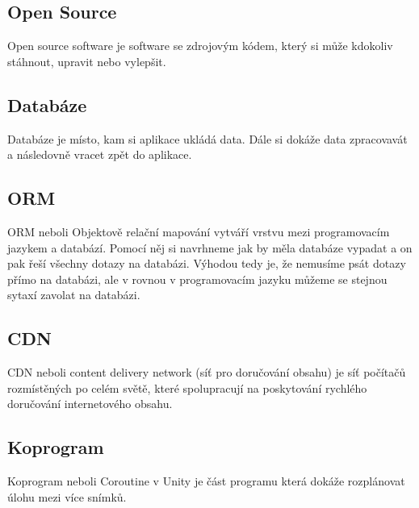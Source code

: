\subsection{Open Source}
Open source software je software se zdrojovým kódem, který si může kdokoliv stáhnout, upravit nebo vylepšit. \cite{OpenSource}

\subsection{Databáze}
Databáze je místo, kam si aplikace ukládá data. Dále si dokáže data zpracovavát a následovně vracet zpět do aplikace.

\subsection{ORM}
ORM neboli Objektově relační mapování vytváří vrstvu mezi programovacím jazykem a databází. Pomocí něj si navrhneme jak by měla databáze vypadat a on pak řeší všechny dotazy na databázi. Výhodou tedy je, že nemusíme psát dotazy přímo na databázi, ale v rovnou v programovacím jazyku můžeme se stejnou sytaxí zavolat na databázi.

\subsection{CDN}
CDN neboli content delivery network (síť pro doručování obsahu) je síť počítačů rozmístěných po celém světě, které spolupracují na poskytování rychlého doručování internetového obsahu.\cite{CDN}

\subsection{Koprogram}
Koprogram neboli Coroutine v Unity je část programu která dokáže rozplánovat úlohu mezi více snímků. 
